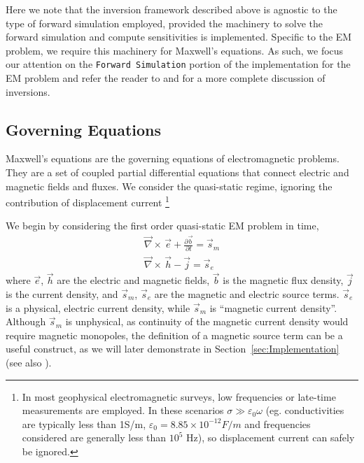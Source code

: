 \documentclass[preprint,review,3p,times,onecolumn,authoryear]{elsarticle}
\newcommand{\curl}{{\vec \nabla}\times\,}
\begin{document}
\bigskip

Here we note that the inversion framework described above is agnostic to the
type of forward simulation employed, provided the machinery to solve the
forward simulation and compute sensitivities is implemented. Specific to the
EM problem, we require this machinery for Maxwell's equations. As such, we
focus our attention  on the \texttt{Forward Simulation} portion of the
implementation for the EM problem and refer the reader to
\cite{Cockett2015} and \cite{OldenburgTutorial} for a more complete discussion
of  inversions.



\subsection{Governing Equations}
\label{sec:GoverningEquations}

Maxwell's equations are the governing equations of electromagnetic problems.
They are a set of coupled partial differential equations that connect electric
and magnetic fields and fluxes. We consider the quasi-static regime, ignoring
the contribution of displacement current \citep{Ward1988, telford1990applied,
Haber2014a} \footnote{In most geophysical electromagnetic surveys, low frequencies or late-time measurements are employed. In these scenarios $\sigma \gg \varepsilon_0 \omega$ (eg. conductivities are typically less than 1S/m, $\varepsilon_0 = 8.85 \times 10^{-12} F/m$ and frequencies considered are generally less than $10^5$ Hz), so displacement current can safely be ignored.}

We begin by considering the first order quasi-static EM problem in time,
\begin{equation}
\begin{split}
\curl \vec{e} + \frac{\partial \vec{b}}{\partial t} = \vec{s}_m \\
\curl \vec{h} - \vec{j} = \vec{s}_e
\end{split}
\label{eq:MaxwellBasicTime}
\end{equation}
where $\vec{e}$, $\vec{h}$ are the electric and magnetic fields, $\vec{b}$ is the magnetic flux density, $\vec{j}$ is the current density, and $\vec{s}_m$, $\vec{s}_e$ are the magnetic and electric source terms. $\vec{s}_e$ is a physical, electric current density, while $\vec{s}_m$ is ``magnetic current density''. Although $\vec{s}_m$ is unphysical, as continuity of the magnetic current density would require magnetic monopoles, the definition of a magnetic source term can be a useful construct, as we will later demonstrate in Section~\ref{sec:Implementation} (see also \cite{Ward1988}).
\end{document}
